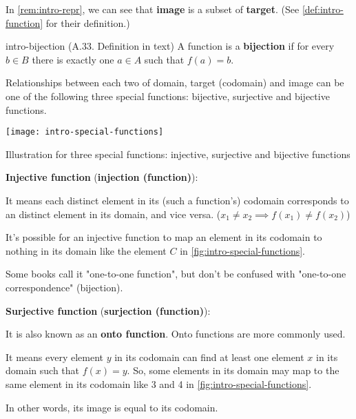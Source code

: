 \documentclass[../src/handouts/main.tex]{subfiles}
\begin{document}
In \cref{rem:intro-repr}, we can see that \textbf{image} is a subset of \textbf{target}. (See \cref{def:intro-function} for their definition.)

\begin{definition}{}{intro-bijection}
  (A.33. Definition in text)
  A function  is a \textbf{bijection} if for every $b \in B$ there is exactly one $a \in A$ such that $f(a) = b$.
\end{definition}

Relationships between each two of domain, target (codomain) and image can be one of the following three special functions: bijective, surjective and bijective functions.

\begin{reusablefigure}
  \centering
  \texttt{[image: intro-special-functions]}
  \caption{Illustration for three special functions: injective, surjective and bijective functions}
  \label{fig:intro-special-functions}
\end{reusablefigure}

\textbf{Injective function} (\textbf{injection (function)}):
\begin{enumerate*}
  \item It means each distinct element in its (such a function's) codomain corresponds to an distinct element in its domain, and vice versa. ($x_1 \neq x_2 \implies f(x_1) \neq f(x_2)$)
  \item It's possible for an injective function to map an element in its codomain to nothing in its domain like the element $C$ in \cref{fig:intro-special-functions}.
  \item Some books call it "one-to-one function", but don't be confused with "one-to-one correspondence" (bijection).
\end{enumerate*}

\textbf{Surjective function} (\textbf{surjection (function)}):
\begin{enumerate*}
  \item It is also known as an \textbf{onto function}. Onto functions are more commonly used.
  \item It means every element $y$ in its codomain can find at least one element $x$ in its domain such that $f(x) = y$. So, some elements in its domain may map to the same element in its codomain like 3 and 4 in \cref{fig:intro-special-functions}.
  \item In other words, its image is equal to its codomain.
\end{enumerate*}
\end{document}
